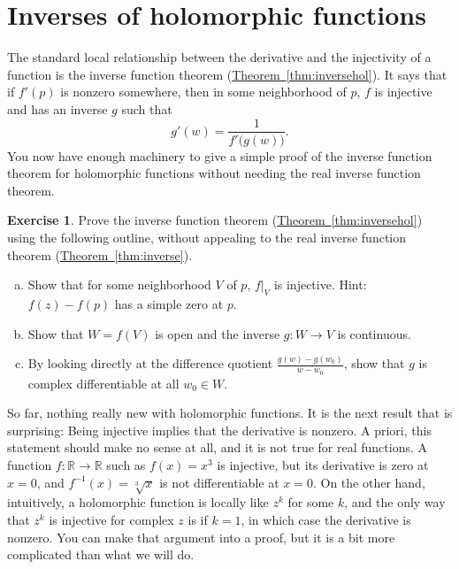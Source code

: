 \documentclass[12pt,openany]{book}
\newcommand{\R}{{\mathbb{R}}}
\theoremstyle{plain}
\theoremstyle{remark}
\theoremstyle{definition}
\newenvironment{exbox}{%
    \def\FrameCommand{\vrule width 1pt \relax\hspace{10pt}}%
    \MakeFramed{\advance\hsize-\width\FrameRestore}%
}{%
    \endMakeFramed
}
\newenvironment{exparts}{%
    \leavevmode\begin{enumerate}[a),noitemsep,topsep=0pt,parsep=0pt,partopsep=0pt]
}{%
    \end{enumerate}
}
\theoremstyle{exercise}
\newtheorem{exercise}{Exercise}[section]
\theoremstyle{example}
\newcommand{\thmref}[1]{\hyperref[#1]{Theorem~\ref*{#1}}}
\begin{document}
\section{Inverses of holomorphic functions} \label{sec:inverses}

The standard local relationship between the derivative and the injectivity of a
function is the inverse function theorem (\thmref{thm:inversehol}).
It says that if $f'(p)$ is nonzero somewhere, then in some
neighborhood of $p$, $f$ is injective and has an inverse $g$ such that
\begin{equation*}
g'(w) = \frac{1}{f'\bigl(g(w)\bigr)} .
\end{equation*}
You now have enough machinery to give a simple proof
of the inverse function theorem for holomorphic functions
without needing the real inverse function theorem.

\begin{exbox}
\begin{exercise}
Prove the inverse function theorem (\thmref{thm:inversehol})
using the following outline, without appealing to the real inverse function
theorem (\thmref{thm:inverse}).
\begin{exparts}
\item Show that for some neighborhood $V$ of $p$, $f|_V$ is injective.
Hint: $f(z)-f(p)$ has a simple zero at $p$.
\item Show that $W = f(V)$ is open and the inverse $g \colon W \to V$ is
continuous.
\item By looking directly at the difference quotient
$\frac{g(w)-g(w_0)}{w-w_0}$,
show that $g$ is complex differentiable at all $w_0 \in W$.
\end{exparts}
\end{exercise}
\end{exbox}

So far, nothing really new with holomorphic functions.
It is the next
result that is surprising: Being injective
implies that the derivative is nonzero.
A priori, this statement should make no sense at all, and it is not true for real functions.
A function $f \colon \R \to \R$ such as $f(x) = x^3$
is injective, but its derivative is zero at $x=0$, and $f^{-1}(x) =
\sqrt[3]{x}$ is not differentiable at $x=0$.
On the other hand, intuitively, a holomorphic function is
locally like $z^k$ for some $k$, and the only way that $z^k$ is injective
for complex $z$ is
if $k=1$, in which case the derivative is nonzero.
You can make that
argument into a proof, but it is a bit more complicated than what we will do.
\end{document}
